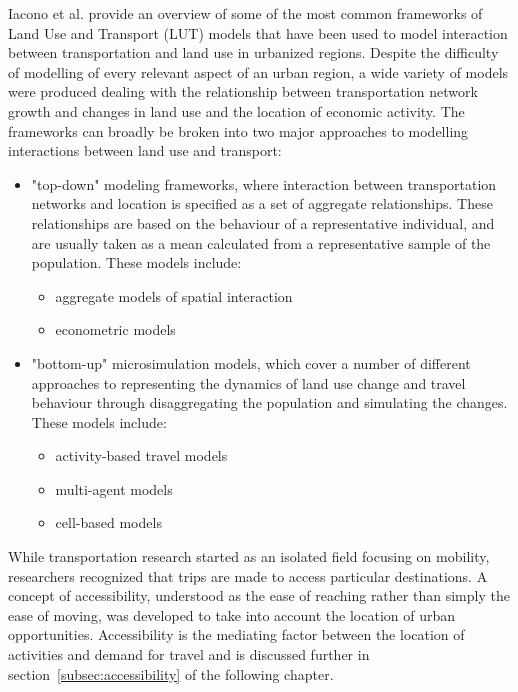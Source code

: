 Iacono et al.
\cite{Iacono2008} provide an overview of some of the most common frameworks of Land Use and Transport (LUT) models that have been used to model interaction between transportation and land use in urbanized regions.
Despite the difficulty of modelling of every relevant aspect of an urban region, a wide variety of models were produced dealing with the relationship between transportation network growth and changes in land use and the location of economic activity.
The frameworks can broadly be broken into two major approaches to modelling interactions between land use and transport:
\begin{itemize}
    \item "top-down" modeling frameworks, where interaction between transportation networks and location is specified as a set of aggregate relationships.
    These relationships are based on the behaviour of a representative individual, and are usually taken as a mean calculated from a representative sample of the population.
    These models include:
    \begin{itemize}
        \item aggregate models of spatial interaction
        \item econometric models
    \end{itemize}
    \item "bottom-up" microsimulation models, which cover a number of different approaches to representing the dynamics of land use change and travel behaviour through disaggregating the population and simulating the changes.
    These models include:
    \begin{itemize}
        \item activity-based travel models
        \item multi-agent models
        \item cell-based models
    \end{itemize}
\end{itemize}

While transportation research started as an isolated field focusing on mobility, researchers recognized that trips are made to access particular destinations\cite{VanLierop2017}.
A concept of accessibility, understood as the ease of reaching rather than simply the ease of moving\cite{Preston2007}, was developed to take into account the location of urban opportunities.
Accessibility is the mediating factor between the location of activities and demand for travel and is discussed further in section~\ref{subsec:accessibility} of the following chapter.

